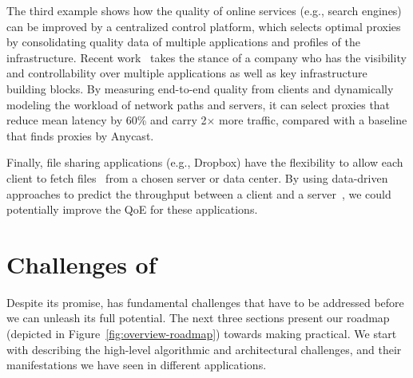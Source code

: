 The third example shows how the quality of online services 
(e.g., search engines) can be improved by a centralized 
control platform, which selects optimal proxies by consolidating
quality data of multiple applications and profiles of the infrastructure.
Recent work~\cite{footprint} takes the stance of a company who 
has the visibility and controllability over multiple applications as 
well as key infrastructure building blocks. 
By measuring end-to-end quality from clients and dynamically 
modeling the workload of network paths and servers, it can 
select proxies that reduce mean latency by 60\% and carry 2$\times$ 
more traffic, compared with a baseline that finds proxies by Anycast.

Finally, file sharing applications (e.g., Dropbox) have
the flexibility to allow each client to fetch files~\cite{drago2012inside} 
from a chosen server or data center.  By using data-driven 
 approaches to predict the throughput between a client and
a server~\cite{cs2p,spand,zhang2001constancy}, we could 
potentially improve the QoE for these applications.








\section{Challenges of \ddn}
\label{sec:overview:challenges}

Despite its promise, \ddn has fundamental challenges that have to be addressed 
before we can unleash its full potential.
The next three sections present our roadmap (depicted in 
Figure~\ref{fig:overview-roadmap}) towards making \ddn practical. We start with
describing the high-level algorithmic and architectural challenges, and their 
manifestations we have seen in different applications.


